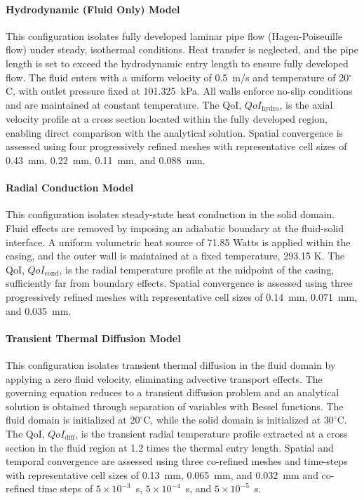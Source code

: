 
\paragraph{Hydrodynamic (Fluid Only) Model}
This configuration isolates fully developed laminar pipe flow (Hagen-Poiseuille flow) under steady, isothermal conditions. Heat transfer is neglected, and the pipe length is set to exceed the hydrodynamic entry length to ensure fully developed flow. The fluid enters with a uniform velocity of 0.5~m/s and temperature of 20$^\circ$C, with outlet pressure fixed at 101.325~kPa. All walls enforce no-slip conditions and are maintained at constant temperature. The QoI, $QoI_{\text{hydro}}$, is the axial velocity profile at a cross section located within the fully developed region, enabling direct comparison with the analytical solution. Spatial convergence is assessed using four progressively refined meshes with representative cell sizes of 0.43~mm, 0.22~mm, 0.11~mm, and 0.088~mm.

\paragraph{Radial Conduction Model}
This configuration isolates steady-state heat conduction in the solid domain. Fluid effects are removed by imposing an adiabatic boundary at the fluid-solid interface. A uniform volumetric heat source of 71.85 Watts is applied within the casing, and the outer wall is maintained at a fixed temperature, 293.15 K. The QoI, $QoI_{\text{cond}}$, is the radial temperature profile at the midpoint of the casing, sufficiently far from boundary effects. Spatial convergence is assessed using three progressively refined meshes with representative cell sizes of 0.14~mm, 0.071~mm, and 0.035~mm.

\paragraph{Transient Thermal Diffusion Model}
This configuration isolates transient thermal diffusion in the fluid domain by applying a zero fluid velocity, eliminating advective transport effects. The governing equation reduces to a transient diffusion problem and an analytical solution is obtained through separation of variables with Bessel functions. The fluid domain is initialized at $20^{\circ}$C, while the solid domain is initialized at $30^{\circ}$C. The QoI, $QoI_{\text{diff}}$, is the transient radial temperature profile extracted at a cross section in the fluid region at 1.2 times the thermal entry length. Spatial and temporal convergence are assessed using three co-refined meshes and time-steps with representative cell sizes of 0.13~mm, 0.065~mm, and 0.032~mm and co-refined time steps of $5\times10^{-3}$~s, $5\times10^{-4}$~s, and $5\times10^{-5}$~s.

